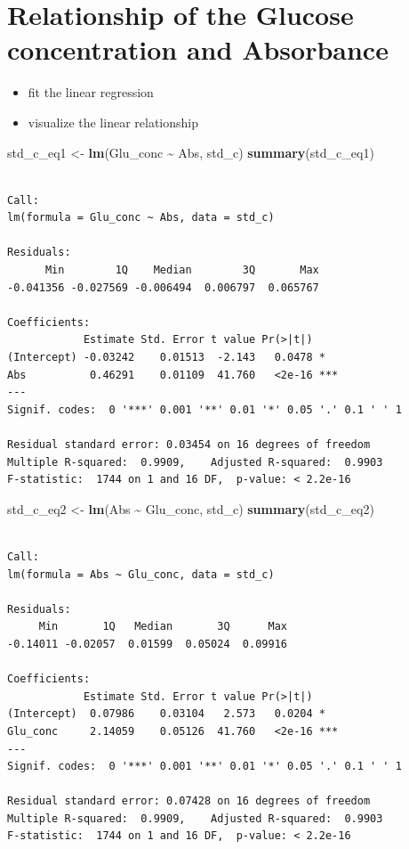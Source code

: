 \documentclass[
  12pt,
]{article}
\newenvironment{Shaded}{\begin{snugshade}}{\end{snugshade}}
\newcommand{\FunctionTok}[1]{\textcolor[rgb]{0.13,0.29,0.53}{\textbf{#1}}}
\newcommand{\NormalTok}[1]{#1}
\newcommand{\OtherTok}[1]{\textcolor[rgb]{0.56,0.35,0.01}{#1}}
\newcommand{\SpecialCharTok}[1]{\textcolor[rgb]{0.81,0.36,0.00}{\textbf{#1}}}
\providecommand{\tightlist}{%
  \setlength{\itemsep}{0pt}\setlength{\parskip}{0pt}}
\begin{document}
\section{Relationship of the Glucose concentration and
Absorbance}\label{relationship-of-the-glucose-concentration-and-absorbance}

\begin{itemize}
\tightlist
\item
  fit the linear regression
\item
  visualize the linear relationship
\end{itemize}

\begin{Shaded}
\begin{Highlighting}[]
\NormalTok{std\_c\_eq1 }\OtherTok{\textless{}{-}} \FunctionTok{lm}\NormalTok{(Glu\_conc }\SpecialCharTok{\textasciitilde{}}\NormalTok{ Abs, std\_c)}
\FunctionTok{summary}\NormalTok{(std\_c\_eq1)}
\end{Highlighting}
\end{Shaded}

\begin{verbatim}

Call:
lm(formula = Glu_conc ~ Abs, data = std_c)

Residuals:
      Min        1Q    Median        3Q       Max 
-0.041356 -0.027569 -0.006494  0.006797  0.065767 

Coefficients:
            Estimate Std. Error t value Pr(>|t|)    
(Intercept) -0.03242    0.01513  -2.143   0.0478 *  
Abs          0.46291    0.01109  41.760   <2e-16 ***
---
Signif. codes:  0 '***' 0.001 '**' 0.01 '*' 0.05 '.' 0.1 ' ' 1

Residual standard error: 0.03454 on 16 degrees of freedom
Multiple R-squared:  0.9909,    Adjusted R-squared:  0.9903 
F-statistic:  1744 on 1 and 16 DF,  p-value: < 2.2e-16
\end{verbatim}

\begin{Shaded}
\begin{Highlighting}[]
\NormalTok{std\_c\_eq2 }\OtherTok{\textless{}{-}} \FunctionTok{lm}\NormalTok{(Abs }\SpecialCharTok{\textasciitilde{}}\NormalTok{ Glu\_conc, std\_c)}
\FunctionTok{summary}\NormalTok{(std\_c\_eq2)}
\end{Highlighting}
\end{Shaded}

\begin{verbatim}

Call:
lm(formula = Abs ~ Glu_conc, data = std_c)

Residuals:
     Min       1Q   Median       3Q      Max 
-0.14011 -0.02057  0.01599  0.05024  0.09916 

Coefficients:
            Estimate Std. Error t value Pr(>|t|)    
(Intercept)  0.07986    0.03104   2.573   0.0204 *  
Glu_conc     2.14059    0.05126  41.760   <2e-16 ***
---
Signif. codes:  0 '***' 0.001 '**' 0.01 '*' 0.05 '.' 0.1 ' ' 1

Residual standard error: 0.07428 on 16 degrees of freedom
Multiple R-squared:  0.9909,    Adjusted R-squared:  0.9903 
F-statistic:  1744 on 1 and 16 DF,  p-value: < 2.2e-16
\end{verbatim}
\end{document}
